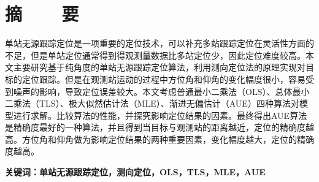 %
%
%
%
%

\topskip=0pt

\vspace*{-7mm}

\begin{center}
  \heiti{}\textbf{\thesisTitle}
\end{center}

\vspace*{2mm}

{\let\clearpage\relax \chapter*{\textmd{摘~~~~要}}}
\setcounter{page}{1}

\vspace*{1mm}

\setlength{\parskip}{0em}

单站无源跟踪定位是一项重要的定位技术，可以补充多站跟踪定位在灵活性方面的不足，但是单站定位通常得到得观测量数据比多站定位少，因此定位难度较高。本文主要研究基于纯角度的单站无源跟踪定位算法，利用测向定位法的原理实现对目标的定位跟踪。但是在观测站运动的过程中方位角和仰角的变化幅度很小，容易受到噪声的影响，导致定位误差较大。本文考虑普通最小二乘法（OLS）、总体最小二乘法（TLS）、极大似然估计法（MLE）、渐进无偏估计（AUE）四种算法对模型进行求解。比较算法的性能，并探究影响定位结果的因素。最终得出AUE算法是精确度最好的一种算法，并且得到当目标与观测站的距离越近，定位的精确度越高。方位角和仰角做为影响定位结果的两种重要因素，变化幅度越大，定位的精确度越高。

\vspace{4ex}\noindent\textbf{\heiti 关键词：单站无源跟踪定位，测向定位，OLS，TLS，MLE，AUE}
\newpage

\topskip=0pt

